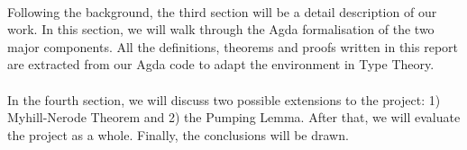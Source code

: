\paragraph{} Following the
background, the third section will be a detail description of our
work. In this section, we will walk through the Agda
formalisation of the two major components. All the definitions,
theorems and proofs written in this report are extracted from our Agda
code to adapt the environment in Type Theory. 

\paragraph{} In the fourth section, we will discuss two possible extensions
to the project: 1) Myhill-Nerode Theorem and 2) the Pumping
Lemma. After that, we will evaluate the project as a
whole. Finally, the conclusions will be drawn. 